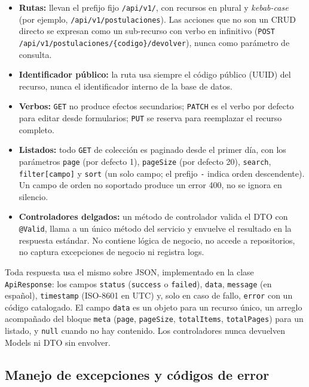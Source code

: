 \begin{itemize}
    \item \textbf{Rutas:} llevan el prefijo fijo \texttt{/api/v1/}, con recursos en plural y \textit{kebab-case} (por ejemplo, \texttt{/api/v1/postulaciones}). Las acciones que no son un CRUD directo se expresan como un sub-recurso con verbo en infinitivo (\texttt{POST /api/v1/postulaciones/\{codigo\}/devolver}), nunca como parámetro de consulta.
    \item \textbf{Identificador público:} la ruta usa siempre el código público (UUID) del recurso, nunca el identificador interno de la base de datos.
    \item \textbf{Verbos:} \texttt{GET} no produce efectos secundarios; \texttt{PATCH} es el verbo por defecto para editar desde formularios; \texttt{PUT} se reserva para reemplazar el recurso completo.
    \item \textbf{Listados:} todo \texttt{GET} de colección es paginado desde el primer día, con los parámetros \texttt{page} (por defecto 1), \texttt{pageSize} (por defecto 20), \texttt{search}, \texttt{filter[campo]} y \texttt{sort} (un solo campo; el prefijo \texttt{-} indica orden descendente). Un campo de orden no soportado produce un error 400, no se ignora en silencio.
    \item \textbf{Controladores delgados:} un método de controlador valida el DTO con \texttt{@Valid}, llama a un único método del servicio y envuelve el resultado en la respuesta estándar. No contiene lógica de negocio, no accede a repositorios, no captura excepciones de negocio ni registra logs.
\end{itemize}

Toda respuesta usa el mismo sobre JSON, implementado en la clase \texttt{ApiResponse}: los campos \texttt{status} (\texttt{success} o \texttt{failed}), \texttt{data}, \texttt{message} (en español), \texttt{timestamp} (ISO-8601 en UTC) y, solo en caso de fallo, \texttt{error} con un código catalogado. El campo \texttt{data} es un objeto para un recurso único, un arreglo acompañado del bloque \texttt{meta} (\texttt{page}, \texttt{pageSize}, \texttt{totalItems}, \texttt{totalPages}) para un listado, y \texttt{null} cuando no hay contenido. Los controladores nunca devuelven Models ni DTO sin envolver.

\subsection{Manejo de excepciones y códigos de error}

